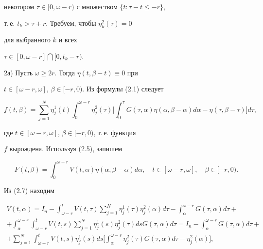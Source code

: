 некотором $ \tau \in[0, \omega-r)$ с множеством $ \{t : \tau-t \leq -r \}$,


т.\,е. $t_{k} > \tau+r$. Требуем, чтобы $\eta_{k}^{2}(\tau) =0$


для выбранного $k$ и всех


$\tau \in[0, \omega-r] \bigcap[0,t_{k} -r)$.





2а) Пусть $ \omega \geq 2r$. Тогда $ \eta(t, \beta-t) \equiv 0$ при


$t \in[\omega-r, \omega]$, $ \beta \in[-r,0)$. Из формулы (2.1) следует


$$


f(t, \beta) = \sum_{j=1}^{N} \eta_{j}^{1}(t) \int_{0}^{\omega-r}


\eta_{j}^{2}(\tau) \bigg[\int_{0}^{\tau}G(\tau, \alpha)


\eta( \alpha, \beta- \alpha) d \alpha - \eta(\tau, \beta- \tau)\bigg] d \tau,


$$


где $ t \in[\omega-r, \omega]$, $\beta \in[-r,0)$, т.\,е. функция


$f$ вырождена. Используя (2.5), запишем


\begin{equation}


F(t, \beta) =\int_{0}^{\omega-r} V(t, \alpha)


\eta(\alpha, \beta- \alpha) d \alpha, \quad t \in[\omega -r, \omega],


\quad \beta \in[-r,0).


\end{equation}


Из (2.7) находим


\begin{multline}


V(t, \alpha) =I_{n} -


\int_{\omega-r}^{t} V(t, \tau) \sum_{j=1}^{N}


\eta_{j}^{1}(\tau) \eta_{j}^{2}(\alpha) d \tau- \int_{\alpha}^{\omega-r}


G(\tau, \alpha) d \tau+ \\


%


+ \int_{\alpha}^{\omega-r} \int_{\omega-r}^{t} V(t,s) \sum_{j=1}^{N}


\eta_{j}^{1}(s) \eta_{j}^{2}(\tau) ds G(\tau, \alpha) d \tau=I_{n} -


\int_{\alpha}^{\omega-r} G(\tau, \alpha) d \tau+ \\


%


+ \sum_{j=1}^{N} \int_{\omega-r}^{t}V(t,s) \eta_{j}^{1}(s) ds


\bigg[\int_{\alpha}^{\omega-r} \eta_{j}^{2}(\tau) G(\tau, \alpha) d \tau


- \eta_{j}^{2}(\alpha)\bigg],


\end{multline}


